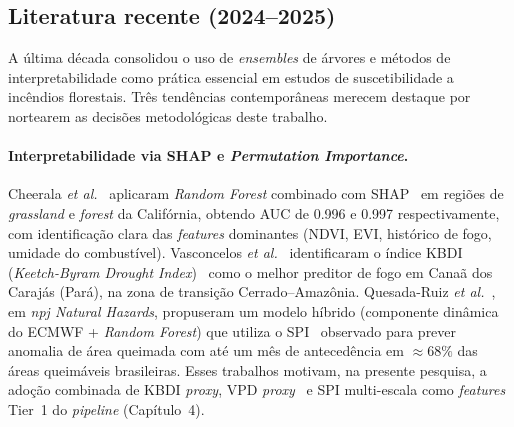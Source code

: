 %

\subsection{Literatura recente (2024--2025)}

A última década consolidou o uso de \emph{ensembles} de árvores e métodos de interpretabilidade como prática essencial em estudos de suscetibilidade a incêndios florestais. Três tendências contemporâneas merecem destaque por nortearem as decisões metodológicas deste trabalho.

\paragraph{Interpretabilidade via SHAP e \emph{Permutation Importance}.} Cheerala \emph{et al.}~\cite{cheerala2025probabilistic} aplicaram \emph{Random Forest} combinado com SHAP~\cite{lundberg2017unified} em regiões de \emph{grassland} e \emph{forest} da Califórnia, obtendo AUC de \num{0,996} e \num{0,997} respectivamente, com identificação clara das \emph{features} dominantes (NDVI, EVI, histórico de fogo, umidade do combustível). Vasconcelos \emph{et al.}~\cite{forests2024cerradoamazon} identificaram o índice KBDI (\emph{Keetch-Byram Drought Index})~\cite{keetch1968drought} como o melhor preditor de fogo em Canaã dos Carajás (Pará), na zona de transição Cerrado--Amazônia. Quesada-Ruiz \emph{et al.}~\cite{npjhazards2025fire}, em \emph{npj Natural Hazards}, propuseram um modelo híbrido (componente dinâmica do ECMWF + \emph{Random Forest}) que utiliza o SPI~\cite{mckee1993spi} observado para prever anomalia de área queimada com até um mês de antecedência em \(\approx 68\%\) das áreas queimáveis brasileiras. Esses trabalhos motivam, na presente pesquisa, a adoção combinada de KBDI \emph{proxy}, VPD \emph{proxy}~\cite{seager2015climatology} e SPI multi-escala como \emph{features} Tier~1 do \emph{pipeline} (Capítulo~4).

